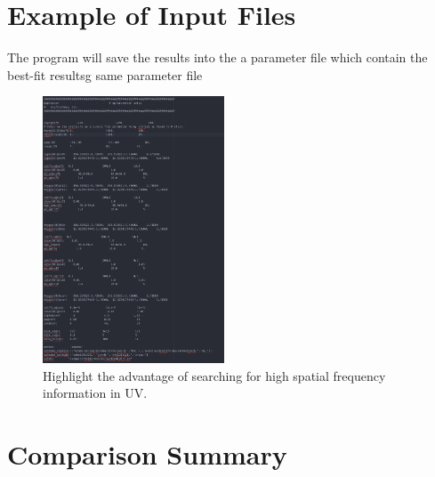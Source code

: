 \documentclass[twocolumn,tighten]{aastex62}
\begin{document}
\section{Example of Input Files}

The program will save the results into the a parameter file which contain the best-fit resultsg same parameter file
\begin{figure}%
\centering
\includegraphics[width=0.48\textwidth]{figures/example-inp.jpeg}
\caption{Highlight the advantage of searching for high spatial frequency information in UV.
}
\end{figure}


\section{Comparison Summary}
\end{document}
